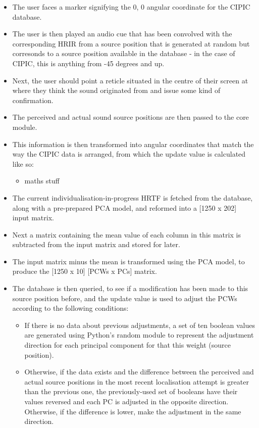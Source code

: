 \begin{itemize}
\item The user faces a marker signifying the 0, 0 angular coordinate for the CIPIC database.
\item The user is then played an audio cue that has been convolved with the corresponding HRIR from a source position that is generated at random but corresonds to a source position available in the database - in the case of CIPIC, this is anything from -45 degrees and up.
\item  Next, the user should point a reticle situated in the centre of their screen at where they think the sound originated from and issue some kind of confirmation. 
\item The perceived and actual sound source positions are then passed to the core module.
\item This information is then transformed into angular coordinates that match the way the CIPIC data is arranged, from which the update value is calculated like so:
\begin{itemize}
\item maths stuff
\end{itemize}
\item The current individualisation-in-progress HRTF is fetched from the database, along with a pre-prepared PCA model, and reformed into a [1250 x 202] input matrix. 
\item Next a matrix containing the mean value of each column in this matrix is subtracted from the input matrix and stored for later. 
\item The input matrix minus the mean is transformed using the PCA model, to produce the [1250 x 10] [PCWs x PCs] matrix. 
\item The database is then queried, to see if a modification has been made to this source position before, and the update value is used to adjust the PCWs according to the following conditions:
\begin{itemize}
\item If there is no data about previous adjustments, a set of ten boolean values are generated using Python's random module\citep{python random} to represent the adjustment direction for each principal component for that this weight (source position). 
\item Otherwise, if the data exists and the difference between the perceived and actual source positions in the most recent localisation attempt is greater than the previous one, the previously-used set of booleans have their values reversed and each PC is adjusted in the opposite direction. Otherwise, if the difference is lower, make the adjustment in the same direction. 

\end{itemize}
\end{itemize}
